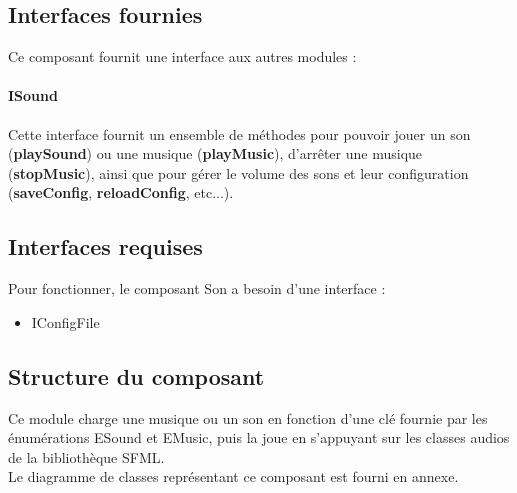 \subsection{Interfaces fournies}

Ce composant fournit une interface aux autres modules :

\paragraph{ISound}

Cette interface fournit un ensemble de méthodes pour pouvoir jouer un son (\textbf{playSound}) ou une musique (\textbf{playMusic}), d'arrêter une musique (\textbf{stopMusic}), ainsi que pour gérer le volume des sons et leur configuration (\textbf{saveConfig}, \textbf{reloadConfig}, etc...).

\subsection{Interfaces requises}

Pour fonctionner, le composant Son a besoin d'une interface :
\begin{itemize}
    \item IConfigFile
\end{itemize}

\subsection{Structure du composant}

Ce module charge une musique ou un son en fonction d'une clé fournie par les énumérations ESound et EMusic, puis la joue en s'appuyant sur les classes audios de la bibliothèque SFML.\\

Le diagramme de classes représentant ce composant est fourni en annexe.